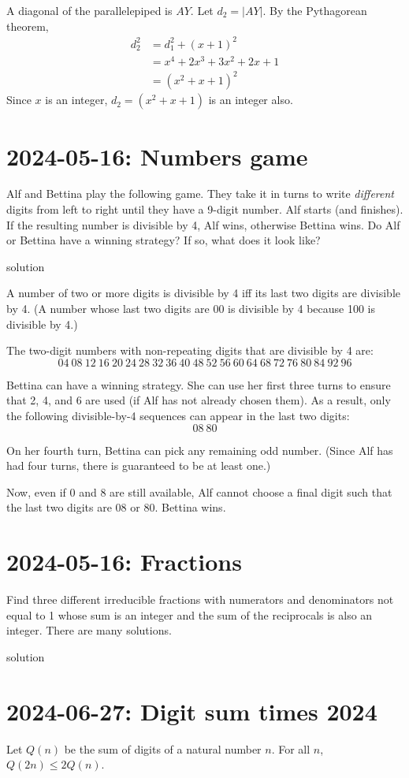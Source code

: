 \documentclass[11pt, oneside]{amsart}
\newcommand{\problem}[2]{\section*{#1: #2}}
\newcommand{\solution}[0]{{\sc solution}}
\begin{document}
A diagonal of the parallelepiped is $AY$. Let $d_2 = |AY|$.
By the Pythagorean theorem,
\begin{align*}
	 d_2^2 &= d_1^2 + (x+1)^2 \\
           &= x^4 + 2x^3 + 3x^2 + 2x + 1 \\
           &= (x^2 + x + 1)^2
\end{align*}
Since $x$ is an integer, $d_2 = (x^2 + x +1)$ is an integer also.

\newpage
\problem{2024-05-16}{Numbers game}

Alf and Bettina play the following game. They take it in turns to write {\em different} digits
from left to right until they have a 9-digit number. Alf starts (and finishes). If the resulting number is divisible by 4, Alf wins, otherwise Bettina wins.
Do Alf or Bettina have a winning strategy? If so, what does it look like?

\solution

A number of two or more digits is divisible by 4 iff its last two digits
are divisible by 4. (A number whose last two digits are $00$ is divisible by
4 because 100 is divisible by 4.)

The two-digit numbers with non-repeating digits that are divisible by 4 are:
\[ 04~08~12~16~20~24~28~32~36~40~48~52~56~60~64~68~72~76~80~84~92~96 \]

Bettina can have a winning strategy. She can use her first three turns
to ensure that 2, 4, and 6 are used (if Alf has not already chosen
them). As a result, only the following divisible-by-4 sequences can appear
in the last two digits:
\[ 08~80 \]

On her fourth turn, Bettina can pick any remaining odd number. (Since Alf
has had four turns, there is guaranteed to be at least one.)

Now, even if 0 and 8 are still available, Alf cannot choose a final digit
such that the last two digits are 08 or 80. Bettina wins.

\newpage
\problem{2024-05-16}{Fractions}

Find three different irreducible fractions with numerators and denominators
not equal to 1 whose sum is an integer and the sum of the reciprocals is
also an integer. There are many solutions.

\solution

\newpage
\problem{2024-06-27}{Digit sum times 2024}

Let $Q(n)$ be the sum of digits of a natural number $n$. For all $n$, $Q(2n) \leq 2Q(n)$.
\end{document}

